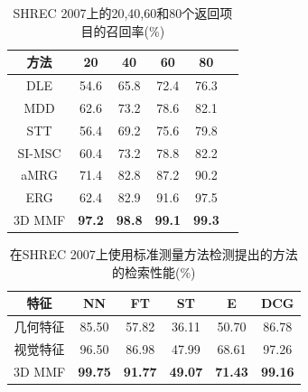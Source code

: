 \begin{table}[tbhp]

\caption{SHREC 2007上的20,40,60和80个返回项目的召回率(\%)} \label{table_retrieval_shrec2007_recall}
\begin{center}
\begin{tabular}{cccccc}  %
\hline  \hline
方法 			    &20     &40     &60     &80   \\ 
\hline
DLE \cite{giorgi2007watertight}   &54.6  &65.8  &72.4  &76.3   \\ 
MDD \cite{giorgi2007watertight}      &62.6  &73.2  &78.6  &82.1  \\
STT \cite{giorgi2007watertight}      &56.4  &69.2  &75.6  &79.8  \\
SI-MSC \cite{giorgi2007watertight}      &60.4  &73.2  &78.8  &82.2  \\
aMRG \cite{giorgi2007watertight}      &71.4  &82.8  &87.2  &90.2  \\
ERG \cite{barra20133d}      &62.4  &82.9  &91.6  &97.5  \\
3D MMF   &\textbf{97.2} &\textbf{98.8} &\textbf{99.1} &\textbf{99.3} \\  
\hline  \hline      %
\end{tabular}
\end{center} 
\end{table}

\begin{table}[tbhp]
\caption{在SHREC 2007上使用标准测量方法检测提出的方法的检索性能(\%)} \label{table_retrieval_shrec2007}
\begin{center}
\begin{tabular}{cccccc}  %
\hline  \hline
特征 			    &NN     &FT     &ST     &E      &DCG \\ 
\hline
几何特征   &85.50  &57.82  &36.11  &50.70  &86.78 \\ 
视觉特征      &96.50  &86.98  &47.99  &68.61  &97.26 \\
3D MMF                  &\textbf{99.75} &\textbf{91.77} &\textbf{49.07} &\textbf{71.43} &\textbf{99.16}\\  
\hline  \hline      %
\end{tabular}
\end{center} 
\end{table}


